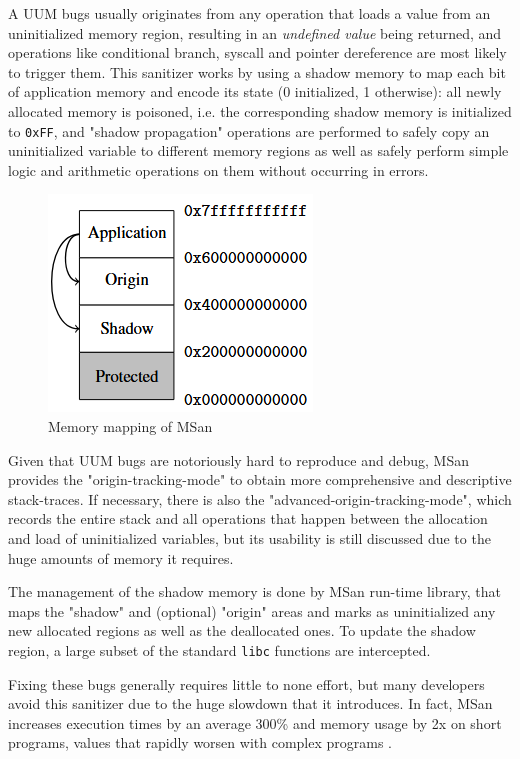 A UUM bugs usually originates from any operation that loads a value from an uninitialized memory region, resulting in an \textit{undefined value} being returned, and operations like conditional branch, syscall and pointer dereference are most likely to trigger them. This sanitizer works by using a shadow memory to map each bit of application memory and encode its state (0 initialized, 1 otherwise): all newly allocated memory is poisoned, i.e. the corresponding shadow memory is initialized to \verb|0xFF|, and "shadow propagation" operations are performed to safely copy an uninitialized variable to different memory regions as well as safely perform simple logic and arithmetic operations on them without occurring in errors.

\begin{figure}[h]
\centering
\includegraphics[scale=0.8]{foto/shadow_memory_2.png}
\caption{Memory mapping of MSan \cite{stepanov2015memorysanitizer}}
\label{fig:msan_shadow}
\end{figure}

Given that UUM bugs are notoriously hard to reproduce and debug, MSan provides the "origin-tracking-mode" to obtain more comprehensive and descriptive stack-traces. If necessary, there is also the "advanced-origin-tracking-mode", which records the entire stack and all operations that happen between the allocation and load of uninitialized variables, but its usability is still discussed due to the huge amounts of memory it requires.

The management of the shadow memory is done by MSan run-time library, that maps the "shadow" and (optional) "origin" areas and marks as uninitialized any new allocated regions as well as the deallocated ones. To update the shadow region, a large subset of the standard \verb|libc| functions are intercepted.

Fixing these bugs generally requires little to none effort, but many developers avoid this sanitizer due to the huge slowdown that it introduces. In fact, MSan increases execution times by an average 300\% and memory usage by 2x on short programs, values that rapidly worsen with complex programs \cite{stepanov2015memorysanitizer}.





